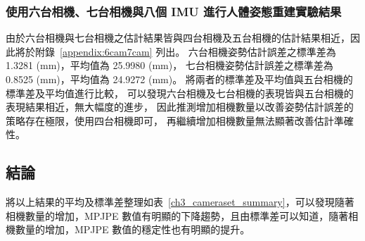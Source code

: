 \clearpage

\subsubsection{使用六台相機、七台相機與八個 IMU 進行人體姿態重建實驗結果}
由於六台相機與七台相機之估計結果皆與四台相機及五台相機的估計結果相近，因此將於附錄~\ref{appendix:6cam7cam} 列出。
六台相機姿勢估計誤差之標準差為 1.3281 (mm)，平均值為 25.9980 (mm)，
七台相機姿勢估計誤差之標準差為 0.8525 (mm)，平均值為 24.9272 (mm)。
將兩者的標準差及平均值與五台相機的標準差及平均值進行比較，
可以發現六台相機及七台相機的表現皆與五台相機的表現結果相近，無大幅度的進步，
因此推測增加相機數量以改善姿勢估計誤差的策略存在極限，使用四台相機即可，
再繼續增加相機數量無法顯著改善估計準確性。

\clearpage

\subsection{結論}
將以上結果的平均及標準差整理如表~\ref{ch3_cameraset_summary}，可以發現隨著相機數量的增加，MPJPE 數值有明顯的下降趨勢，且由標準差可以知道，隨著相機數量的增加，MPJPE 數值的穩定性也有明顯的提升。

\begin{table}[ht]
   \caption{MPJPE 數值的平均及標準差}
   \label{ch3_cameraset_summary}
   \setlength{\tabcolsep}{3pt}
   \renewcommand\arraystretch{1.5}
\end{table}


